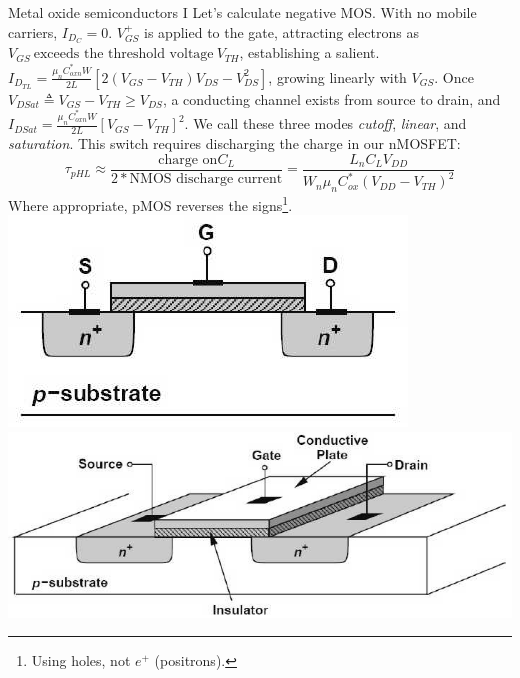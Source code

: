\documentclass[mathserif,xcolor={dvipsnames,table}]{beamer}
\begin{document}
\begin{frame}{Metal oxide semiconductors I}
\scriptsize{Let's calculate negative MOS. With no
mobile carriers, $I_{D_{C}} = 0$. $V^{+}_{GS}$
is applied to the gate, attracting electrons as $V_{GS}\ \text{exceeds the threshold
voltage}\ V_{TH}$, establishing a salient.
$I_{D_{TL}} = \frac{\mu_{n}C^{*}_{oxn}W}{2L}\left[2(V_{GS} - V_{TH})V_{DS} - V^{2}_{DS}\right]$, growing
linearly with $V_{GS}$. Once $V_{DSat}\triangleq V_{GS} - V_{TH} \ge V_{DS}$, a
conducting channel exists from source to drain, and $I_{DSat} = \frac{\mu_{n}C^{*}_{oxn}W}{2L}\left[V_{GS} - V_{TH}\right]^{2}$. We call these three modes \textit{cutoff},
\textit{linear}, and \textit{saturation}. This switch requires discharging the charge in our nMOSFET:\\
\begin{equation}
\tau_{pHL} \approx \frac{\text{charge on} C_L}{2 * \text{NMOS discharge current}} = \frac{L_{n}C_{L}V_{DD}}{W_{n}\mu_{n}C^{*}_{ox}\left(V_{DD} - V_{TH}\right)^{2}}
\end{equation}
Where appropriate, pMOS reverses the signs\footnote{Using holes, not $e^{+}$ (positrons).}.
}
\vfill
\includegraphics[scale=.3]{images/oe-001.png}
\includegraphics[scale=.3]{images/oe-000.png}
\end{frame}
\end{document}
